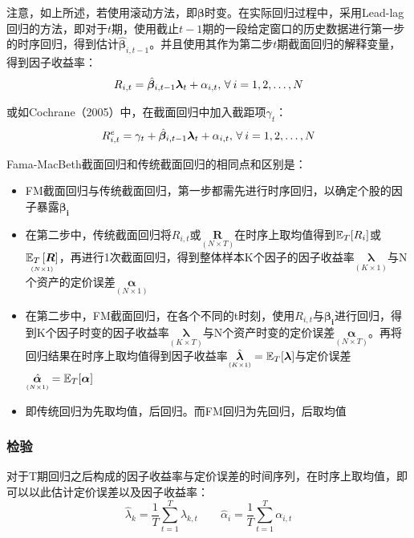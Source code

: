 \documentclass[11pt]{article}
\begin{document}
注意，如上所述，若使用滚动方法，即$\bm{\beta}$时变。在实际回归过程中，采用Lead-lag回归的方法，即对于$t$期，使用截止$t-1$期的一段给定窗口的历史数据进行第一步的时序回归，得到估计$\hat{\bm{\beta}}_{i,t-1}$。并且使用其作为第二步$t$期截面回归的解释变量，得到因子收益率：
\begin{equation*}
    R_{i,t} = \hat{\bm{\beta}}_{i,t-1} \bm{\lambda}_t + \alpha_{i,t} \ilsep \forall i=1,2,\dots,N
\end{equation*}

或如Cochrane（2005）中，在截面回归中加入截距项$\gamma_t$：
\begin{equation*}
    R_{i,t}^{e} = \gamma_t + \hat{\bm{\beta}}_{i,t-1} \bm{\lambda}_t + \alpha_{i,t} \ilsep \forall i=1,2,\dots,N
\end{equation*}

Fama-MacBeth截面回归和传统截面回归的相同点和区别是：
\begin{itemize}
    \item FM截面回归与传统截面回归，第一步都需先进行时序回归，以确定个股的因子暴露$\bm{\beta_i}$
    \item 在第二步中，传统截面回归将$R_{i,t}$或$\underset{\scriptscriptstyle{(N \times T)}}{\bm{R}}$在时序上取均值得到$\mathbb{E}_T[R_i]$或$\underset{\scriptscriptstyle{(N \times 1)}}{\mathbb{E}_T\left[\bm{R}\right]}$，再进行1次截面回归，得到整体样本K个因子的因子收益率$\underset{\scriptscriptstyle{(K \times 1)}}{\bm{\lambda}}$与N个资产的定价误差$\underset{\scriptscriptstyle(N \times 1)}{\bm{\alpha}}$
    \item 在第二步中，FM截面回归，在各个不同的t时刻，使用$R_{i,t}$与$\bm{\beta_{i}}$进行回归，得到K个因子时变的因子收益率$\underset{\scriptscriptstyle{(K \times T)}}{\bm{\lambda}}$与N个资产时变的定价误差$\underset{\scriptscriptstyle(N \times T)}{\bm{\alpha}}$。再将回归结果在时序上取均值得到因子收益率$\underset{\scriptscriptstyle{(K \times 1)}}{\hat{\bm{\lambda}}} = \mathbb{E}_T[\bm{\lambda}]$与定价误差$\underset{\scriptscriptstyle{(N \times 1)}}{\hat{\bm{\alpha}}} = \mathbb{E}_T[\bm{\alpha}]$
    \item 即传统回归为先取均值，后回归。而FM回归为先回归，后取均值
\end{itemize}

\subsubsection{检验}

对于T期回归之后构成的因子收益率与定价误差的时间序列，在时序上取均值，即可以以此估计定价误差以及因子收益率：
\begin{equation*}
    \hat{\lambda}_k = \frac{1}{T} \sum_{t=1}^{T} \lambda_{k,t}
    \qquad
    \hat{\alpha}_i = \frac{1}{T} \sum_{t=1}^{T} \alpha_{i,t}
\end{equation*}
\end{document}
